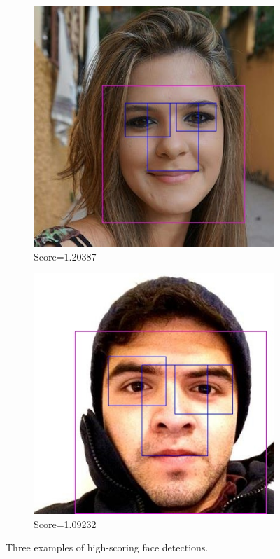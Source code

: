 \begin{figure}
\begin{subfigure}[b]{0.3\textwidth}
      \includegraphics[width=\textwidth]{figures/spec/detected_50508cb1-814e-4374-bf07-cef5c301c3c0}
      \caption{Score=1.20387}
      \label{fig:spec:fd:good_detected2}
    \end{subfigure}
    \begin{subfigure}[b]{0.3\textwidth}
      \includegraphics[width=\textwidth]{figures/spec/detected_da153846-1afe-4b36-880a-bf8764bfd935}
      \caption{Score=1.09232}
      \label{fig:spec:fd:good_detected3}
    \end{subfigure}
\caption{Three examples of high-scoring face detections.}
\label{fig:spec:fd:good_detected}
\end{figure}

